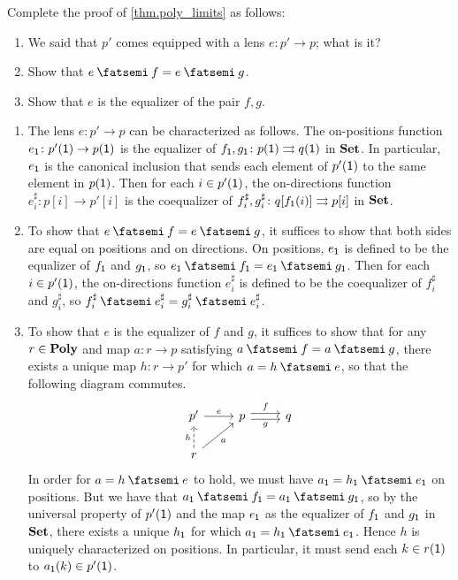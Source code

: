 \documentclass[Book-Poly]{subfiles}
\begin{document}
\begin{exercise}\label{exc.poly_limits}
Complete the proof of \cref{thm.poly_limits} as follows:
\begin{enumerate}
	\item We said that $p'$ comes equipped with a lens $e \colon p' \to p$; what is it?
	\item Show that $e \then f = e \then g$.
	\item Show that $e$ is the equalizer of the pair $f,g$.
\qedhere
\end{enumerate}
\begin{solution}
\begin{enumerate}
    \item The lens $e \colon p' \to p$ can be characterized as follows.
    The on-positions function $e_{\textsf{1}} \colon p'(\textsf{1}) \to p(\textsf{1})$ is the equalizer of $f_{\textsf{1}}, g_{\textsf{1}} \colon p(\textsf{1}) \rightrightarrows q(\textsf{1})$ in $\mathbf{Set}$.
    In particular, $e_{\textsf{1}}$ is the canonical inclusion that sends each element of $p'(\textsf{1})$ to the same element in $p(\textsf{1})$.
    Then for each $i \in p'(\textsf{1})$, the on-directions function $e^\sharp_i \colon p[i] \to p'[i]$ is the coequalizer of $f^\sharp_i, g^\sharp_i \colon q[f_{\textsf{1}}(i)] \rightrightarrows p[i]$ in $\mathbf{Set}$.
    
    \item To show that $e \then f = e \then g$, it suffices to show that both sides are equal on positions and on directions.
    On positions, $e_{\textsf{1}}$ is defined to be the equalizer of $f_{\textsf{1}}$ and $g_{\textsf{1}}$, so $e_\1 \then f_\1 = e_\1 \then g_\1$.
    Then for each $i \in p'(\textsf{1})$, the on-directions function $e^\sharp_i$ is defined to be the coequalizer of $f^\sharp_i$ and $g^\sharp_i$, so $f^\sharp_i \then e^\sharp_i = g^\sharp_i \then e^\sharp_i$.
    
    \item To show that $e$ is the equalizer of $f$ and $g$, it suffices to show that for any $r \in \mathbf{Poly}$ and map $a \colon r \to p$ satisfying $a \then f = a \then g$, there exists a unique map $h \colon r \to p'$ for which $a = h \then e$, so that the following diagram commutes.
    \begin{equation*} %
    \begin{tikzcd}
        p' \ar[r, "e"] & p \ar[r, "f", shift left] \ar[r, "g"', shift right] & q \\
        r \ar[u, "h", dashed] \ar[ur, "a"']
    \end{tikzcd}
    \end{equation*}
    In order for $a = h \then e$ to hold, we must have $a_\1 = h_\1 \then e_\1$ on positions.
    But we have that $a_\1 \then f_\1 = a_\1 \then g_\1$, so by the universal property of $p'(\textsf{1})$ and the map $e_{\textsf{1}}$ as the equalizer of $f_{\textsf{1}}$ and $g_{\textsf{1}}$ in $\mathbf{Set}$, there exists a unique $h_{\textsf{1}}$ for which $a_\1 = h_\1 \then e_\1$.
    Hence $h$ is uniquely characterized on positions.
    In particular, it must send each $k \in r(\textsf{1})$ to $a_{\textsf{1}}(k) \in p'(\textsf{1})$.
    

\end{enumerate}
\end{solution}
\end{exercise}
\end{document}
